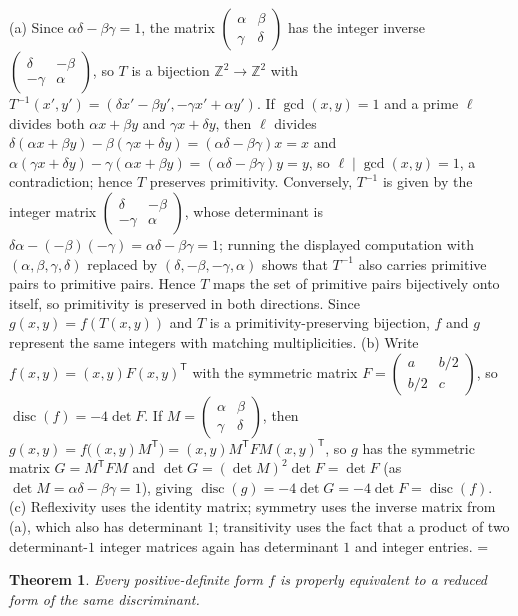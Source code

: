 \documentclass[11pt]{article}
\makeatletter
\theoremstyle{ntstyle}
\newtheorem{theorem}{Theorem}[subsection]
\let\nt@closedisplay\]
\def\nt@guardedclose{\@ifnextchar\par{\nt@closeafterpar}{\@ifnextchar\end{\postdisplaypenalty\@M\nt@closedisplay}{\nt@closedisplay}}}
\def\nt@closeafterpar\par{\@ifnextchar\par{\nt@closeafterpar}{\@ifnextchar\end{\postdisplaypenalty\@M\nt@closedisplay\par}{\nt@closedisplay\par}}}
\renewenvironment{proof}[1][\proofname]{\par
  \pushQED{\qed}\normalfont\topsep\medskipamount\edef\nt@afterproof{\@endparpenalty=\the\@endparpenalty\relax}\@beginparpenalty\@M\@endparpenalty\@M\let\]\nt@guardedclose\trivlist\item[]\textit{#1\@addpunct{.}} \ignorespaces}{\ifvmode\addpenalty\@M\fi\popQED\nt@afterproof\endtrivlist\@endpefalse}
\DeclareMathOperator{\disc}{disc}
\makeatother
\begin{document}
\begin{proof} (a) Since $\alpha\delta-\beta\gamma=1$, the
	matrix $
		\begin{pmatrix}\alpha & \beta \\\gamma&\delta
		\end{pmatrix}$ has the integer inverse $
		\begin{pmatrix}\delta & -\beta \\-\gamma&\alpha
		\end{pmatrix}$, so $T$ is a bijection
	$\mathbb{Z}^2\to\mathbb{Z}^2$ with
	$T^{-1}(x',y')=(\delta x'-\beta y',-\gamma x'+\alpha y')$. If $\gcd(x,
		y)=1$ and a prime $\ell$ divides both $\alpha x+\beta y$ and $\gamma
		x+\delta y$, then $\ell$ divides
	$\delta(\alpha x+\beta y)-\beta(\gamma x+\delta
		y)=(\alpha\delta-\beta\gamma)x=x$ and $\alpha(\gamma x+\delta
		y)-\gamma(\alpha x+\beta y)=(\alpha\delta-\beta\gamma)y=y$, so
	$\ell\mid\gcd(x, y)=1$, a contradiction; hence $T$ preserves
	primitivity. Conversely, $T^{-1}$ is given by the integer matrix
	$\begin{pmatrix}\delta&-\beta\\-\gamma&\alpha\end{pmatrix}$, whose
	determinant is
	$\delta\alpha-(-\beta)(-\gamma)=\alpha\delta-\beta\gamma=1$; running
	the displayed computation with
	$(\alpha,\beta,\gamma,\delta)$ replaced by
	$(\delta,-\beta,-\gamma,\alpha)$ shows that $T^{-1}$ also carries
	primitive pairs to primitive pairs. Hence $T$ maps the set of
	primitive pairs bijectively onto itself, so primitivity is preserved
	in both directions. Since
	$g(x,y)=f(T(x,y))$ and $T$ is a primitivity-preserving bijection, $f$
	and $g$ represent the same integers with matching multiplicities.
	(b) Write $f(x,y)=(x,y)F(x,y)^{\mathsf{T}}$ with the symmetric matrix $F=
		\begin{pmatrix}a & b/2 \\b/2&c
		\end{pmatrix}$, so $\disc(f)=-4\det F$. If $M=
		\begin{pmatrix}\alpha & \beta \\\gamma&\delta
		\end{pmatrix}$, then $g(x,y)=f\big((x,y)M^{\mathsf{T}}\big)=(x,y)M^{\mathsf{T}} F
		M(x,y)^{\mathsf{T}}$, so $g$ has the symmetric matrix $G=M^{\mathsf{T}}FM$ and $\det
		G=(\det M)^2\det F=\det F$ (as $\det
		M=\alpha\delta-\beta\gamma=1$), giving
	$\disc(g)=-4\det G=-4\det F=\disc(f)$.
	(c) Reflexivity uses the identity matrix; symmetry uses the inverse
	matrix from (a), which also has determinant $1$; transitivity uses
	the fact that a product of two determinant-$1$ integer matrices again has
	determinant $1$ and integer entries.
\end{proof}
\begin{theorem}\label{thm:8.6.2} Every positive-definite form $f$ is properly equivalent to a
	reduced form of the same discriminant.
\end{theorem}
\end{document}
